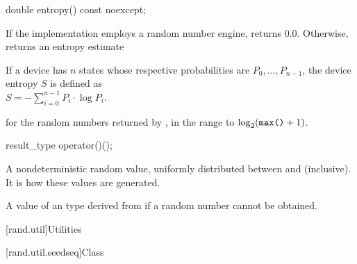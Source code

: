 %
\begin{itemdecl}
double entropy() const noexcept;
\end{itemdecl}

\begin{itemdescr}
\pnum
\returns
If the implementation employs a random number engine,
 returns $0.0$.
 Otherwise, returns an entropy estimate
\begin{footnote}
If a device has $n$ states
   whose respective probabilities are
   $P_0, \dotsc, P_{n-1}$,
   the device entropy $S$ is defined as\\
   $S = - \sum_{i=0}^{n-1} P_i \cdot \log P_i$.
\end{footnote}
 for the random numbers returned by ,
 in the range
 to
   $\log_2( \tcode{max()}+1)$.
\end{itemdescr}

%
\begin{itemdecl}
result_type operator()();
\end{itemdecl}

\begin{itemdescr}
\pnum
\returns
A nondeterministic random value,
 uniformly distributed
 between  and  (inclusive).
 It is 
 how these values are generated.

\pnum
\throws
A value of an 
 type derived from 
 if a random number cannot be obtained.
\end{itemdescr}




[rand.util]{Utilities}%
%


[rand.util.seedseq]{Class }%

